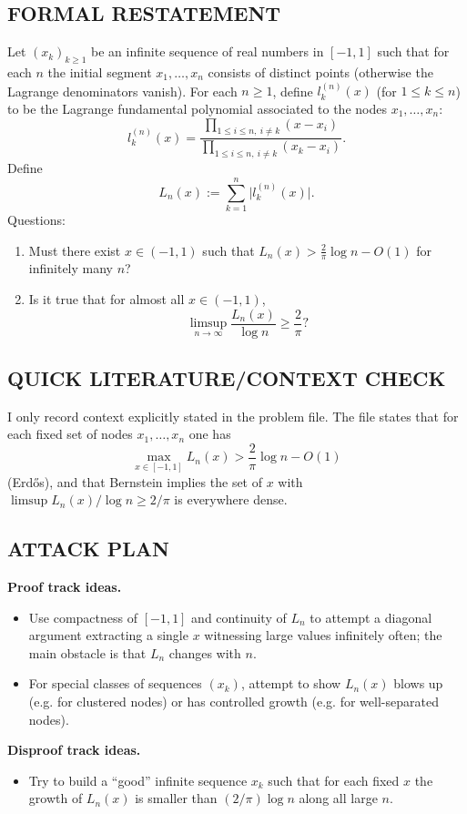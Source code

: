 \subsection*{FORMAL RESTATEMENT}
Let $(x_k)_{k\ge 1}$ be an infinite sequence of real numbers in $[-1,1]$ such that for each $n$ the initial segment $x_1,\dots,x_n$ consists of distinct points (otherwise the Lagrange denominators vanish).
For each $n\ge 1$, define $l_k^{(n)}(x)$ (for $1\le k\le n$) to be the Lagrange fundamental polynomial associated to the nodes $x_1,\dots,x_n$:
\[
 l_k^{(n)}(x)=\frac{\prod_{1\le i\le n,\ i\ne k}(x-x_i)}{\prod_{1\le i\le n,\ i\ne k}(x_k-x_i)}.
\]
Define
\[
L_n(x):=\sum_{k=1}^n \bigl|l_k^{(n)}(x)\bigr|.
\]
Questions:
\begin{enumerate}
\item Must there exist $x\in(-1,1)$ such that $L_n(x) > \tfrac{2}{\pi}\log n - O(1)$ for infinitely many $n$?
\item Is it true that for almost all $x\in(-1,1)$,
\[\limsup_{n\to\infty} \frac{L_n(x)}{\log n}\ge \frac{2}{\pi}?\]
\end{enumerate}

\subsection*{QUICK LITERATURE/CONTEXT CHECK}
I only record context explicitly stated in the problem file.
The file states that for each fixed set of nodes $x_1,\dots,x_n$ one has
\[
\max_{x\in[-1,1]} L_n(x) > \frac{2}{\pi}\log n - O(1)
\]
(Erd\H{o}s), and that Bernstein implies the set of $x$ with $\limsup L_n(x)/\log n\ge 2/\pi$ is everywhere dense.

\subsection*{ATTACK PLAN}
\textbf{Proof track ideas.}
\begin{itemize}
\item Use compactness of $[-1,1]$ and continuity of $L_n$ to attempt a diagonal argument extracting a single $x$ witnessing large values infinitely often; the main obstacle is that $L_n$ changes with $n$.
\item For special classes of sequences $(x_k)$, attempt to show $L_n(x)$ blows up (e.g. for clustered nodes) or has controlled growth (e.g. for well-separated nodes).
\end{itemize}
\textbf{Disproof track ideas.}
\begin{itemize}
\item Try to build a ``good'' infinite sequence $x_k$ such that for each fixed $x$ the growth of $L_n(x)$ is smaller than $(2/\pi)\log n$ along all large $n$.
\end{itemize}

